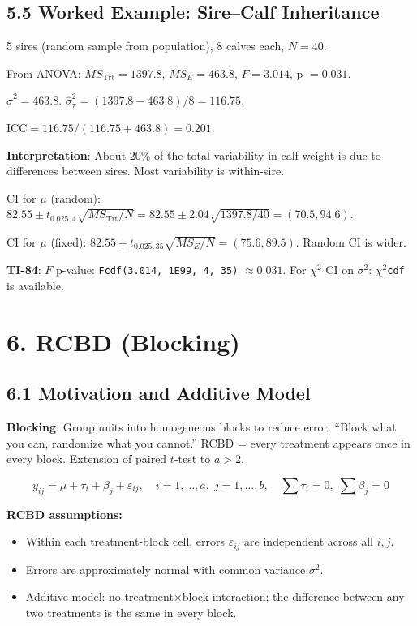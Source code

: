 \documentclass[9pt,letterpaper]{article}
\begin{document}
\subsection{5.5 Worked Example: Sire--Calf Inheritance}

5 sires (random sample from population), 8 calves each, $N=40$.

From ANOVA: $MS_{\text{Trt}}=1397.8$, $MS_E=463.8$, $F=3.014$, p $=0.031$.

$\hat\sigma^2 = 463.8$. \quad $\hat\sigma_\tau^2 = (1397.8-463.8)/8 = 116.75$.

$\text{ICC} = 116.75/(116.75+463.8) = 0.201$.

\textbf{Interpretation}: About 20\% of the total variability in calf weight is due to differences between sires. Most variability is within-sire.

CI for $\mu$ (random): $82.55 \pm t_{0.025,4}\sqrt{MS_{\text{Trt}}/N} = 82.55 \pm 2.04\sqrt{1397.8/40} = (70.5, 94.6)$.

CI for $\mu$ (fixed): $82.55 \pm t_{0.025,35}\sqrt{MS_E/N} = (75.6, 89.5)$.  Random CI is wider.

\begin{calcbox}
\textbf{TI-84}: $F$ p-value: \texttt{Fcdf(3.014, 1E99, 4, 35)} $\approx 0.031$. For $\chi^2$ CI on $\sigma^2$: \texttt{$\chi^2$cdf} is available.
\end{calcbox}

\section{6. RCBD (Blocking)}

\subsection{6.1 Motivation and Additive Model}

\textbf{Blocking}: Group units into homogeneous blocks to reduce error. ``Block what you can, randomize what you cannot.'' RCBD = every treatment appears once in every block. Extension of paired $t$-test to $a > 2$.

\[
y_{ij} = \mu + \tau_i + \beta_j + \varepsilon_{ij}, \quad i=1,\ldots,a,\; j=1,\ldots,b, \quad \sum\tau_i=0,\; \sum\beta_j=0
\]


\textbf{RCBD assumptions:}
\begin{itemize}
  \item Within each treatment-block cell, errors $\varepsilon_{ij}$ are independent across all $i,j$.
  \item Errors are approximately normal with common variance $\sigma^2$.
  \item Additive model: no treatment$\times$block interaction; the difference between any two treatments is the same in every block.
\end{itemize}
\end{document}
